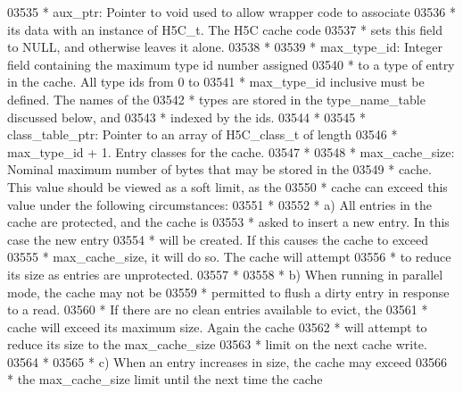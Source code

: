 \begin{DoxyCode}
03535 \textcolor{comment}{ * aux\_ptr: Pointer to void used to allow wrapper code to associate}
03536 \textcolor{comment}{ *      its data with an instance of H5C\_t.  The H5C cache code}
03537 \textcolor{comment}{ *      sets this field to NULL, and otherwise leaves it alone.}
03538 \textcolor{comment}{ *}
03539 \textcolor{comment}{ * max\_type\_id: Integer field containing the maximum type id number assigned}
03540 \textcolor{comment}{ *      to a type of entry in the cache.  All type ids from 0 to}
03541 \textcolor{comment}{ *      max\_type\_id inclusive must be defined.  The names of the}
03542 \textcolor{comment}{ *      types are stored in the type\_name\_table discussed below, and}
03543 \textcolor{comment}{ *      indexed by the ids.}
03544 \textcolor{comment}{ *}
03545 \textcolor{comment}{ * class\_table\_ptr: Pointer to an array of H5C\_class\_t of length}
03546 \textcolor{comment}{ *              max\_type\_id + 1.  Entry classes for the cache.}
03547 \textcolor{comment}{ *}
03548 \textcolor{comment}{ * max\_cache\_size:  Nominal maximum number of bytes that may be stored in the}
03549 \textcolor{comment}{ *              cache.  This value should be viewed as a soft limit, as the}
03550 \textcolor{comment}{ *              cache can exceed this value under the following circumstances:}
03551 \textcolor{comment}{ *}
03552 \textcolor{comment}{ *              a) All entries in the cache are protected, and the cache is}
03553 \textcolor{comment}{ *                 asked to insert a new entry.  In this case the new entry}
03554 \textcolor{comment}{ *                 will be created.  If this causes the cache to exceed}
03555 \textcolor{comment}{ *                 max\_cache\_size, it will do so.  The cache will attempt}
03556 \textcolor{comment}{ *                 to reduce its size as entries are unprotected.}
03557 \textcolor{comment}{ *}
03558 \textcolor{comment}{ *              b) When running in parallel mode, the cache may not be}
03559 \textcolor{comment}{ *         permitted to flush a dirty entry in response to a read.}
03560 \textcolor{comment}{ *         If there are no clean entries available to evict, the}
03561 \textcolor{comment}{ *         cache will exceed its maximum size.  Again the cache}
03562 \textcolor{comment}{ *                 will attempt to reduce its size to the max\_cache\_size}
03563 \textcolor{comment}{ *                 limit on the next cache write.}
03564 \textcolor{comment}{ *}
03565 \textcolor{comment}{ *      c) When an entry increases in size, the cache may exceed}
03566 \textcolor{comment}{ *         the max\_cache\_size limit until the next time the cache}

\end{DoxyCode}
